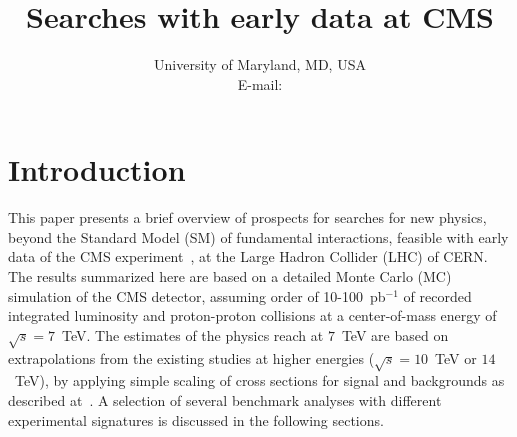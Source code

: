 \documentclass{PoS}
\title{Searches with early data at CMS}
\author{\speaker{Francesco Santanastasio}%
       University of Maryland, MD, USA\\
       E-mail: \email{francesco.santanastasio@cern.ch}}
\begin{document}
\section{Introduction}
This paper presents a brief overview of prospects for searches for new physics, 
beyond the Standard Model (SM) of fundamental interactions, feasible with early data of the 
CMS experiment~\cite{CMS:2008zzk}, at the Large Hadron Collider (LHC) of CERN.
The results summarized here are based on a detailed Monte Carlo (MC) simulation of 
the CMS detector, assuming order of 10-100~pb$^{-1}$ 
of recorded integrated luminosity and proton-proton collisions 
at a center-of-mass energy of $\sqrt{s} = 7$~TeV. 
The estimates of the physics reach at $7$~TeV are based on extrapolations from the existing studies 
at higher energies ($\sqrt{s} = 10$~TeV or $14$~TeV), 
by applying simple scaling of cross sections for signal and backgrounds as described 
at~\cite{CMSPhysicsReach7TeV}. A selection of several benchmark analyses with different experimental 
signatures is discussed in the following sections.
\end{document}
